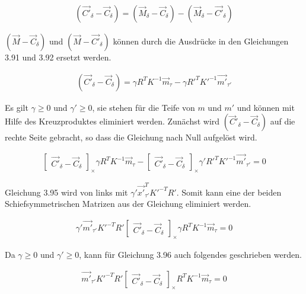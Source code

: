 \begin{gather}
	(\vec{C'}_\delta - \vec{C}_\delta) = (\vec{M}_\delta - \vec{C}_\delta) - (\vec{M}_\delta - \vec{C'}_\delta)
\end{gather}

$(\vec{M}-\vec{C}_\delta)$ und $(\vec{M} - \vec{C'}_\delta)$ können durch die Ausdrücke in den Gleichungen 3.91 und 3.92 ersetzt werden.

\begin{gather}
		(\vec{C'}_\delta - \vec{C}_\delta) = \gamma R^TK^{-1}\vec{m}_\tau - \gamma R'^TK'^{-1}\vec{m'}_{\tau'}
\end{gather}

Es gilt $\gamma \geq 0$ und $\gamma' \geq 0$, sie stehen für die Teife von $m$ und $m'$ und können mit Hilfe des Kreuzproduktes eliminiert werden\cite{Elements}. Zunächst wird $(\vec{C}'_\delta - \vec{C}_\delta)$ auf die rechte Seite gebracht, so dass die Gleichung nach Null aufgelöst wird.


\begin{gather}
	\begin{bmatrix}\vec{C'}_\delta - \vec{C}_\delta\end{bmatrix}_\times \gamma R^TK^{-1}\vec{m}_\tau - 
	\begin{bmatrix}	\vec{C'}_\delta - \vec{C}_\delta\end{bmatrix}_\times \gamma' R'^TK'^{-1} \vec{m'}_{\tau'} =  0
\end{gather}

Gleichung 3.95 wird von links mit $\gamma' \vec{x'}^T_{\tau'}K'^{-T}R'$. Somit kann eine der beiden Schiefsymmetrischen Matrizen aus der Gleichung eliminiert werden. 

\begin{gather}
	\gamma' \vec{m'}_{\tau'} K'^{-T}R' \begin{bmatrix}	\vec{C'}_\delta - \vec{C}_\delta\end{bmatrix}_\times \gamma R^TK^{-1}\vec{m}_\tau = 0
\end{gather}

Da $\gamma \geq 0$ und $\gamma' \geq 0$, kann für Gleichung 3.96 auch folgendes geschrieben werden.

\begin{gather}
	 \vec{m'}_{\tau'} K'^{-T}R' \begin{bmatrix}	\vec{C'}_\delta - \vec{C}_\delta\end{bmatrix}_\times R^TK^{-1}\vec{m}_\tau = 0
\end{gather}

